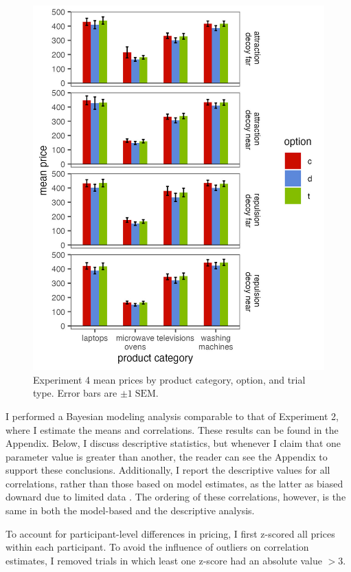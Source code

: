 \begin{figure}
    \includegraphics{figures/price_m_by_effect_category.jpeg}
    \caption{Experiment 4 mean prices by product category, option, and trial type. Error bars are $\pm 1\;\text{SEM}$.}
    \label{fig:price_m_by_effect_category}
\end{figure}

I performed a Bayesian modeling analysis comparable to that of Experiment 2, where I estimate the means and correlations. These results can be found in the Appendix. Below, I discuss descriptive statistics, but whenever I claim that one parameter value is greater than another, the reader can see the Appendix to support these conclusions. Additionally, I report the descriptive values for all correlations, rather than those based on model estimates, as the latter as biased downard due to limited data \parencite{stephens2020state,merkle2023opaque}. The ordering of these correlations, however, is the same in both the model-based and the descriptive analysis.

To account for participant-level differences in pricing, I first z-scored all prices within each participant. To avoid the influence of outliers on correlation estimates, I removed trials in which least one z-score had an absolute value $>3$. 

